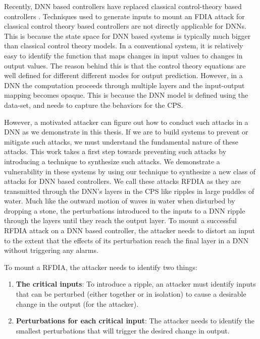 Recently,  \ac{DNN} based controllers have replaced classical control-theory based controllers \cite{xiang18} \cite{Kocic2019} \cite{bechtel2017deeppicar}.  
Techniques used to generate inputs to mount an FDIA attack for classical control theory based controllers are not directly applicable for DNNs.
This is because the state space for DNN based systems is typically much bigger than classical control theory models. 
In a conventional system, it is relatively easy to identify the function that maps changes in input values to changes in output values. 
The reason behind this is that the control theory equations are well defined for different different modes for output prediction.
However, in a \ac{DNN} the computation proceeds through multiple layers and the input-output mapping becomes opaque. 
This is because the \ac{DNN} model is defined using the data-set, and needs to capture the behaviors for the \ac{CPS}.

However, a motivated attacker can figure out how to conduct such attacks in a \ac{DNN} as we demonstrate in this thesis. 
If we are to build systems to prevent or mitigate such attacks, we must understand the fundamental nature of these attacks. 
This work takes a first step towards preventing such attacks by introducing a technique to synthesize such attacks. 
We demonstrate a vulnerability in these systems by using our technique to synthesize a new class of attacks for DNN based controllers. 
We call these attacks \ac{RFDIA} as they are transmitted through the DNN's layers in the CPS like ripples in large puddles of water. 
Much like the outward motion of waves in water when disturbed by dropping a stone, the perturbations introduced to the inputs to a DNN ripple through the layers until they reach the output layer. 
To mount a successful \ac{RFDIA} attack on a DNN based controller, the attacker needs to distort an input to the extent that the effects of its perturbation reach the final layer in a DNN without triggering any alarms. 


To mount a \ac{RFDIA}, the attacker needs to identify two things: 
\begin{enumerate}
	\item \textbf{The critical inputs}: To introduce a ripple, an attacker must identify inputs that can be perturbed (either together or in isolation) to cause a desirable change in the output (for the attacker).
	\item \textbf{Perturbations for each critical input}: The attacker needs to identify the smallest perturbations that will trigger the desired change in output. 
\end{enumerate}


